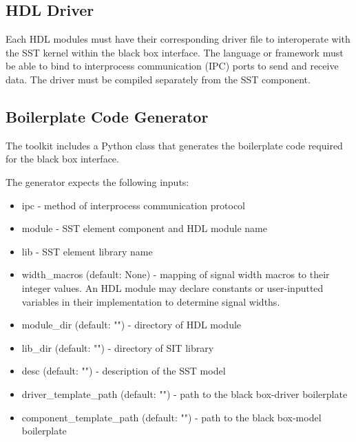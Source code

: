 \documentclass{article}
\begin{document}
    \subsection{HDL Driver}
    Each HDL modules must have their corresponding driver file to interoperate with the SST kernel
    within the black box interface. The language or framework must be able to bind to interprocess
    communication (IPC) ports to send and receive data. The driver must be compiled separately from
    the SST component.

    \subsection{Boilerplate Code Generator}
    The toolkit includes a Python class that generates the boilerplate code required for the black
    box interface.

    The generator expects the following inputs:
    \begin{itemize}

      \item ipc - method of interprocess communication protocol

      \item module - SST element component and HDL module name

      \item lib - SST element library name

      \item width\_macros (default: None) - mapping of signal width macros to their integer values. An HDL module may declare constants or user-inputted variables in their implementation to determine signal widths.

      \item module\_dir (default: "") - directory of HDL module

      \item lib\_dir (default: "") - directory of SIT library

      \item desc (default: "") - description of the SST model

      \item driver\_template\_path (default: "") - path to the black box-driver boilerplate

      \item component\_template\_path (default: "") - path to the black box-model boilerplate

    \end{itemize}
\end{document}
